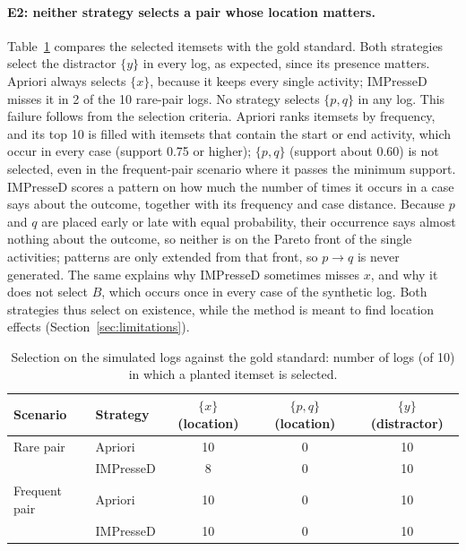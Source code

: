 \documentclass{article}
\begin{document}
\paragraph{E2: neither strategy selects a pair whose location matters.} Table~\ref{tab:gold} compares the selected itemsets with the gold standard. Both strategies select the distractor $\{y\}$ in every log, as expected, since its presence matters. Apriori always selects $\{x\}$, because it keeps every single activity; IMPresseD misses it in 2 of the 10 rare-pair logs. No strategy selects $\{p,q\}$ in any log. This failure follows from the selection criteria. Apriori ranks itemsets by frequency, and its top 10 is filled with itemsets that contain the start or end activity, which occur in every case (support 0.75 or higher); $\{p,q\}$ (support about 0.60) is not selected, even in the frequent-pair scenario where it passes the minimum support. IMPresseD scores a pattern on how much the number of times it occurs in a case says about the outcome, together with its frequency and case distance. Because $p$ and $q$ are placed early or late with equal probability, their occurrence says almost nothing about the outcome, so neither is on the Pareto front of the single activities; patterns are only extended from that front, so $p \to q$ is never generated. The same explains why IMPresseD sometimes misses $x$, and why it does not select $B$, which occurs once in every case of the synthetic log. Both strategies thus select on existence, while the method is meant to find location effects (Section~\ref{sec:limitations}).

\begin{table}[H]
    \centering
    \caption{Selection on the simulated logs against the gold standard: number of logs (of 10) in which a planted itemset is selected.}
    \label{tab:gold}
    \small
    \begin{tabular}{@{}llccc@{}}
        \toprule
        Scenario & Strategy & $\{x\}$ (location) & $\{p,q\}$ (location) & $\{y\}$ (distractor) \\
        \midrule
        Rare pair & Apriori & 10 & 0 & 10 \\
         & IMPresseD & 8 & 0 & 10 \\
        Frequent pair & Apriori & 10 & 0 & 10 \\
         & IMPresseD & 10 & 0 & 10 \\
        \bottomrule
    \end{tabular}
\end{table}
\end{document}
